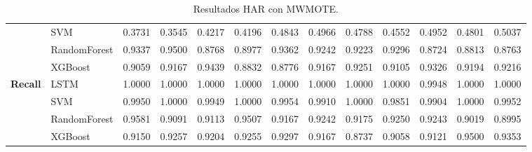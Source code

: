 \begin{table}[h]
\begin{adjustbox}{max width=15cm}
\begin{tabular}{|c|l|r|r|r|r|r|r|r|r|r|r|r|}
			& SVM &  0.3731 &  0.3545 &  0.4217 &  0.4196 &  0.4843 &  0.4966 &  0.4788 &  0.4552 &  0.4952 &  0.4801 &  0.5037 \\
			& RandomForest &  0.9337 &  0.9500 &  0.8768 &  0.8977 &  0.9362 &  0.9242 &  0.9223 &  0.9296 &  0.8724 &  0.8813 &  0.8763 \\
			& XGBoost &  0.9059 &  0.9167 &  0.9439 &  0.8832 &  0.8776 &  0.9167 &  0.9251 &  0.9105 &  0.9326 &  0.9194 &  0.9216 \\
			\hline
			\textbf{Recall} & LSTM &  1.0000 &  1.0000 &  1.0000 &  1.0000 &  1.0000 &  1.0000 &  1.0000 &  1.0000 &  0.9948 &  1.0000 &  1.0000 \\
			& SVM &  0.9950 &  1.0000 &  0.9949 &  1.0000 &  0.9954 &  0.9910 &  1.0000 &  0.9851 &  0.9904 &  1.0000 &  0.9952 \\
			& RandomForest &  0.9581 &  0.9091 &  0.9113 &  0.9507 &  0.9167 &  0.9242 &  0.9175 &  0.9250 &  0.9243 &  0.9019 &  0.8995 \\
			& XGBoost &  0.9150 &  0.9257 &  0.9204 &  0.9255 &  0.9297 &  0.9167 &  0.8737 &  0.9058 &  0.9121 &  0.9500 &  0.9353 \\
			\hline
		\end{tabular}
	\end{adjustbox}
	\caption{Resultados HAR con MWMOTE.}
	\label{tab:HAR_MWMOTE}
\end{table}
\newpage
